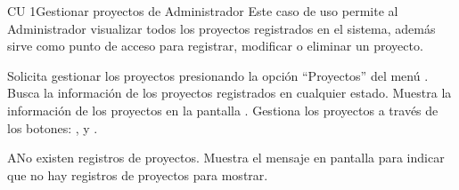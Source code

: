 \newpage 
\begin{UseCase}{CU 1}{Gestionar proyectos de Administrador}
	{
		Este caso de uso permite al Administrador visualizar todos los proyectos registrados en el sistema, además sirve como punto de acceso para registrar, modificar o eliminar un proyecto.
	}
	
	

	


\end{UseCase}
 \begin{UCtrayectoria}
    \UCpaso[\UCactor] Solicita gestionar los proyectos presionando la opción ``Proyectos'' del menú .
    \UCpaso[\UCsist] Busca la información de los proyectos registrados en cualquier estado. 
    \UCpaso[\UCsist] Muestra la información de los proyectos en la pantalla .
    \UCpaso[\UCactor] Gestiona los proyectos a través de los botones: , \btnEditar y \btnEliminar. \label{cu1:gestiona}
 \end{UCtrayectoria}
 
 \begin{UCtrayectoriaA}{A}{No existen registros de proyectos.}
    \UCpaso[\UCsist] Muestra el mensaje  en pantalla  
    para indicar que no hay registros de proyectos para mostrar.
 \end{UCtrayectoriaA}
 

